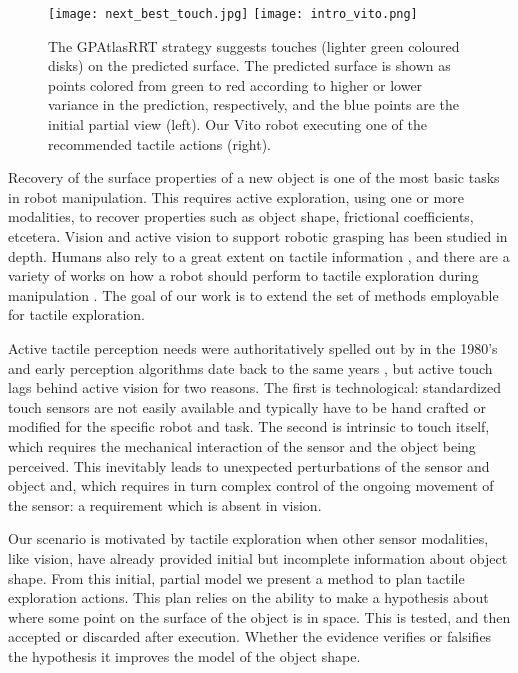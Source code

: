 \begin{figure*}
\centering
  \texttt{[image: next\_best\_touch.jpg]}
  \texttt{[image: intro\_vito.png]}
\caption{The GPAtlasRRT strategy suggests touches (lighter green coloured disks) on the predicted surface. The predicted surface is shown as points colored from green to red according to higher or lower variance in the prediction, respectively, and the blue points are the initial partial view (left). Our Vito robot executing one of the recommended tactile actions (right). }
\label{fig:setup_solution}
\end{figure*}

Recovery of the surface properties of a new object is one of the most basic tasks in robot manipulation. This requires active exploration, using one or more modalities, to recover properties such as object shape, frictional coefficients, etcetera. Vision and active vision to support robotic grasping \cite{Kragic2002TechRep,nunez2013models,arruda16,kopicki2015ijrr,kootstra2012a} has been studied in depth. Humans also rely to a great extent on tactile information \cite{johansson92}, and there are a variety of works on how a robot should perform to tactile exploration during manipulation \cite{zito2013sequential,jentoft2014a,Bjorkman2013Enhancing,Hebert2013Next,Petrovskaya2011Global}. The goal of our work is to extend the set of methods employable for tactile exploration.

Active tactile perception needs were authoritatively spelled out by \cite{Bajcsy1988Active} in the 1980's and early perception algorithms date back to the same years \cite{Grimson1984JRR,Faugeras1983IJCAI,Shekhar1986ICRA,Bajcsy1989Machine}, but active touch lags behind active vision for two reasons. The first is technological: standardized touch sensors are not easily available and typically have to be hand crafted or modified for the specific robot and task. The second is intrinsic to touch itself, which requires the mechanical interaction of the sensor and the object being perceived. This inevitably leads to unexpected perturbations of the sensor and object and, which requires in turn complex control of the ongoing movement of the sensor: a requirement which is absent in vision.

Our scenario is motivated by tactile exploration when other sensor modalities, like vision, have already provided initial but incomplete information about object shape. From this initial, partial model we present a method to plan tactile exploration actions. This plan relies on the ability to make a hypothesis about where some point on the surface of the object is in space. This is tested, and then accepted or discarded after execution. Whether the evidence verifies or falsifies the hypothesis it improves the model of the object shape.

